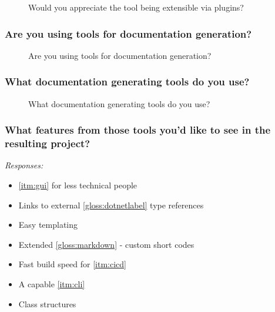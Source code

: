 \begin{figure}[H]
    \centering
    \caption{Would you appreciate the tool being extensible via plugins?}
\end{figure}

\subsubsection*{Are you using tools for documentation generation?}

\begin{figure}[H]
    \centering
    \label{fig:qUsingToolsForDocGen}
    \caption{Are you using tools for documentation generation?}
\end{figure}

\subsubsection*{What documentation generating tools do you use?}

\begin{figure}[H]
    \centering
    \caption{What documentation generating tools do you use?}
\end{figure}

\subsubsection*{What features from those tools you'd like to see in the resulting project?}

\textit{Responses:}
\begin{itemize}
    \item \ref{itm:gui} for less technical people
    \item Links to external \ref{gloss:dotnetlabel} type references
    \item Easy templating
    \item Extended \ref{gloss:markdown} - custom short codes
    \item Fast build speed for \ref{itm:cicd}
    \item A capable \ref{itm:cli}
    \item Class structures
\end{itemize}


